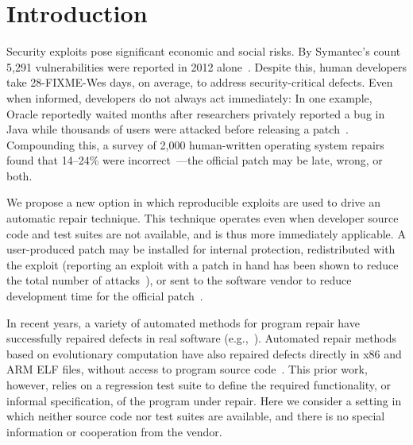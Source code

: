 \documentclass{sigcomm-alternate}
\begin{document}
\section{Introduction}
\label{sec-1}
Security exploits pose significant economic and social risks. By Symantec's
count 5,291 vulnerabilities were reported in 2012
alone~\cite{symantec2013threat}. Despite this, human developers take
28-FIXME-Wes
days, on average, to address security-critical defects. Even
when informed, developers do not always act immediately:  In one example,
Oracle reportedly waited months after researchers privately reported a bug
in Java while thousands of users were attacked before releasing a
patch~\cite{greenberg2012oracle}.  Compounding this, a survey of 2,000
human-written operating system repairs found that 14--24\% were
incorrect~\cite{fixes-become-bugs}---the official patch may be late, wrong,
or both.  

We propose a new option in which reproducible exploits are used to drive an
automatic repair technique. This technique operates even when developer
source code and test suites are not available, and is thus more immediately
applicable. A user-produced patch may be installed for internal protection,
redistributed with the exploit (reporting an exploit with a patch in hand
has been shown to reduce the total number of attacks~\cite{arora2006does}),
or sent to the software vendor to reduce development time for the official
patch~\cite{weimer06}.

In recent years, a variety of automated methods for program repair have 
successfully repaired defects in real software
(e.g.,~\cite{clearview,genprog-tse-journal,par,nguyen2013semfix}).
Automated repair methods based on evolutionary computation have also
repaired defects directly in x86 and ARM ELF files, without access to
program source code~\cite{schulte2013embedded}.  This prior work,
however, relies on a regression test suite to define the required
functionality, or informal specification, of the program under repair.
Here we consider a setting in which neither source code nor test
suites are available, and there is no special information or
cooperation from the vendor.  
\end{document}
